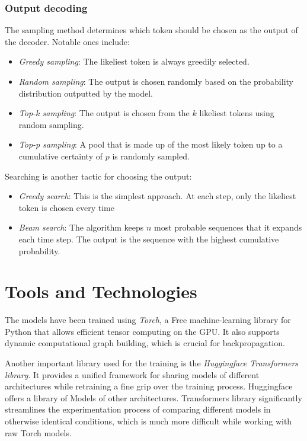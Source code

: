 
\subsection{Output decoding}
The sampling method determines which token should be chosen as the output of the decoder. Notable ones include:
\begin{itemize}
        \item \emph{Greedy sampling}: The likeliest token is always greedily selected.
        \item \emph{Random sampling}: The output is chosen randomly based on the probability distribution outputted by the model.
        \item \emph{Top-k sampling}: The output is chosen from the $k$ likeliest tokens using random sampling. 
        \item \emph{Top-p sampling}: A pool that is made up of the most likely token up to a cumulative certainty of $p$ is randomly sampled.
\end{itemize}

Searching is another tactic for choosing the output:

\begin{itemize}
  \item \emph{Greedy search}: This is the simplest approach. At each step, only the likeliest token is chosen every time\,\cite{SpeechLanguageFeb2024}
        \item \emph{Beam search}: The algorithm keeps $n$ most probable sequences that it expands each time step. The output is the sequence with the highest cumulative probability.
\end{itemize}

\chapter{Tools and Technologies}
    
    The models have been trained using \emph{Torch}, a Free machine-learning library for Python that allows efficient tensor computing on the GPU. It also supports dynamic computational graph building, which is crucial for backpropagation. 
    
    Another important library used for the training is the \emph{Huggingface Transformers library}. It provides a unified framework for sharing models of different architectures while retraining a fine grip over the training process. Huggingface offers a library of Models of other architectures. Transformers library significantly streamlines the experimentation process of comparing different models in otherwise identical conditions, which is much more difficult while working with raw Torch models.


